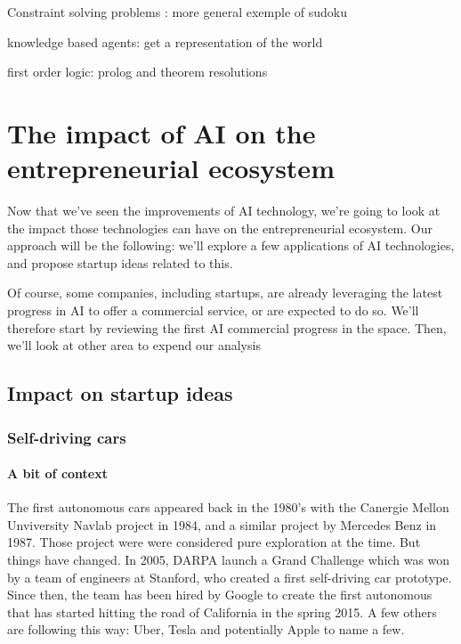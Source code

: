 \documentclass[12pt]{article}
\begin{document}
Constraint solving problems : more general
exemple of sudoku


knowledge based agents: get a representation of the world

first order logic: prolog and theorem resolutions

\pagebreak



\section{The impact of AI on the entrepreneurial ecosystem}

Now that we've seen the improvements of AI technology, we're going to look at
the impact those technologies can have on the entrepreneurial ecosystem.
Our approach will be the following: we'll explore a few applications of AI
technologies, and propose startup ideas related to this.

Of course, some companies, including startups, are already leveraging the latest
progress in AI to offer a commercial service, or are expected to do so.
We'll therefore start by reviewing the first AI commercial progress in the
space. Then, we'll look at other area to expend our analysis

\subsection{Impact on startup ideas}

\subsubsection{Self-driving cars}

\paragraph{A bit of context}

The first autonomous cars appeared back in the 1980's with the Canergie Mellon
Unviversity Navlab project in 1984, and a similar project by Mercedes Benz in
1987. Those project were were considered pure exploration at the time.
But things have changed. In 2005, DARPA launch a Grand Challenge which was won
by a team of engineers at Stanford, who created a first self-driving car
prototype. Since then, the team has been hired by Google to create the first
autonomous that has started hitting the road of California in the spring 2015.
A few others are following this way: Uber, Tesla and potentially Apple to name
a few.
\end{document}

